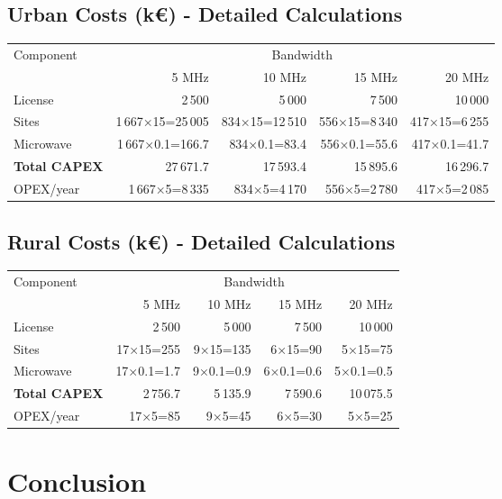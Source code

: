 \documentclass[a4paper,12pt]{article}
\begin{document}
\subsection*{Urban Costs (k€) - Detailed Calculations}
\begin{center}
\begin{tabular}{@{}l *{4}{r}@{}}
\toprule
Component & \multicolumn{4}{c}{Bandwidth} \\
\cmidrule(lr){2-5}
 & 5 MHz & 10 MHz & 15 MHz & 20 MHz \\
\midrule
License & 2\,500 & 5\,000 & 7\,500 & 10\,000 \\
Sites & 1\,667×15=25\,005 & 834×15=12\,510 & 556×15=8\,340 & 417×15=6\,255 \\
Microwave & 1\,667×0.1=166.7 & 834×0.1=83.4 & 556×0.1=55.6 & 417×0.1=41.7 \\
\midrule
\textbf{Total CAPEX} & 27\,671.7 & 17\,593.4 & 15\,895.6 & 16\,296.7 \\
OPEX/year & 1\,667×5=8\,335 & 834×5=4\,170 & 556×5=2\,780 & 417×5=2\,085 \\
\bottomrule
\end{tabular}
\end{center}

\subsection*{Rural Costs (k€) - Detailed Calculations}
\begin{center}
\begin{tabular}{@{}l *{4}{r}@{}}
\toprule
Component & \multicolumn{4}{c}{Bandwidth} \\
\cmidrule(lr){2-5}
 & 5 MHz & 10 MHz & 15 MHz & 20 MHz \\
\midrule
License & 2\,500 & 5\,000 & 7\,500 & 10\,000 \\
Sites & 17×15=255 & 9×15=135 & 6×15=90 & 5×15=75 \\
Microwave & 17×0.1=1.7 & 9×0.1=0.9 & 6×0.1=0.6 & 5×0.1=0.5 \\
\midrule
\textbf{Total CAPEX} & 2\,756.7 & 5\,135.9 & 7\,590.6 & 10\,075.5 \\
OPEX/year & 17×5=85 & 9×5=45 & 6×5=30 & 5×5=25 \\
\bottomrule
\end{tabular}
\end{center}

\section{Conclusion}
\end{document}
